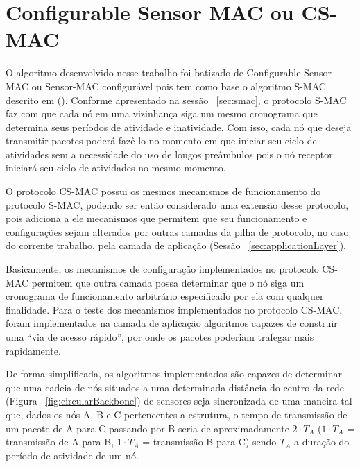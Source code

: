 \section{Configurable Sensor MAC ou CS-MAC}

O algoritmo desenvolvido nesse trabalho foi batizado de Configurable Sensor MAC ou Sensor-MAC configurável pois tem como base o algoritmo S-MAC descrito em  (\citeyear{ye04}). Conforme apresentado na sessão ~\ref{sec:smac}, o protocolo S-MAC faz com que cada nó em uma vizinhança siga um mesmo cronograma que determina seus períodos de atividade e inatividade. Com isso, cada nó que deseja transmitir pacotes poderá fazê-lo no momento em que iniciar seu ciclo de atividades sem a necessidade do uso de longos preâmbulos pois o nó receptor iniciará seu ciclo de atividades no mesmo momento.

O protocolo CS-MAC possui os mesmos mecanismos de funcionamento do protocolo S-MAC, podendo ser então considerado uma extensão desse protocolo, pois adiciona a ele mecanismos que permitem que seu funcionamento e configurações sejam alterados por outras camadas da pilha de protocolo, no caso do corrente trabalho, pela camada de aplicação (Sessão ~\ref{sec:applicationLayer}). 

Basicamente, os mecanismos de configuração implementados no protocolo CS-MAC permitem que outra camada possa determinar que o nó siga um cronograma de funcionamento arbitrário especificado por ela com qualquer finalidade. Para o teste dos mecanismos implementados no protocolo CS-MAC, foram implementados na camada de aplicação algoritmos capazes de construir uma ``via de acesso rápido'', por onde os pacotes poderiam trafegar mais rapidamente.

De forma simplificada, os algoritmos implementados são capazes de determinar que uma cadeia de nós situados a uma determinada distância do centro da rede (Figura ~\ref{fig:circularBackbone}) de sensores seja sincronizada de uma maneira tal que, dados os nós A, B e C pertencentes a estrutura, o tempo de transmissão de um pacote de A para C passando por B seria de aproximadamente $2 \cdot T_A$  ($1 \cdot T_A$ = transmissão de A para B, $1 \cdot T_A$ = transmissão B para C) sendo $T_A$ a duração do período de atividade de um nó. 

